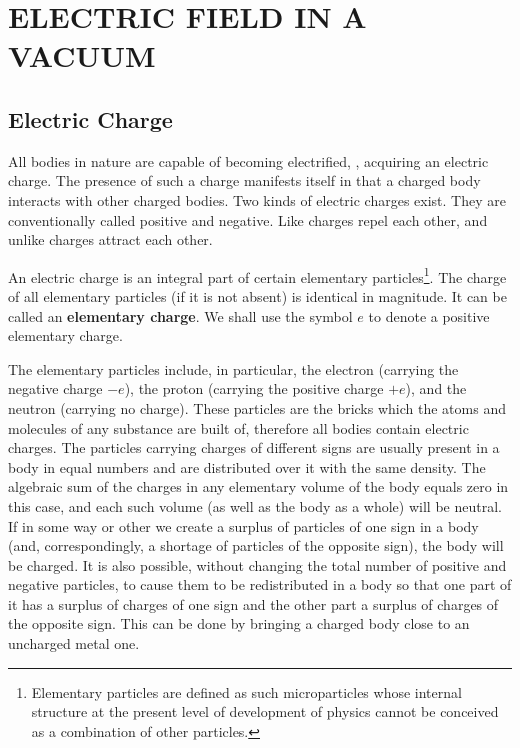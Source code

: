 

\chapter{ELECTRIC FIELD IN A VACUUM}\label{chap:1}

\section{Electric Charge}\label{sec:1_1}

All bodies in nature are capable of becoming electrified, \ie, acquiring an electric charge. The presence of such a charge manifests itself in that a charged body interacts with other charged bodies. Two kinds of electric charges exist. They are conventionally called positive and negative. Like charges repel each other, and unlike charges attract each other.

An electric charge is an integral part of certain elementary particles\footnote{Elementary particles are defined as such microparticles whose internal structure at the present level of development of physics cannot be conceived as a combination of other particles.}. The charge of all elementary particles (if it is not absent) is identical in magnitude. It can be called an \textbf{elementary charge}. We shall use the symbol $e$ to denote a positive elementary charge.

The elementary particles include, in particular, the electron (carrying the negative charge $-e$), the proton (carrying the positive charge $+e$), and the neutron (carrying no charge). These particles are the bricks which the atoms and molecules of any substance are built of, therefore all bodies contain electric charges. The particles carrying charges of different signs are usually present in a body in equal numbers and are distributed over it with the same density. The algebraic sum of the charges in any elementary volume of the body equals zero in this case, and each such volume (as well as the body as a whole) will be neutral. If in some way or other we create a surplus of particles of one sign in a body (and, correspondingly, a shortage of particles of the opposite sign), the body will be charged. It is also possible, without changing the total number of positive and negative particles, to cause them to be redistributed in a body so that one part of it has a surplus of charges of one sign and the other part a surplus of charges of the opposite sign. This can be done by bringing a charged body close to an uncharged metal one.

